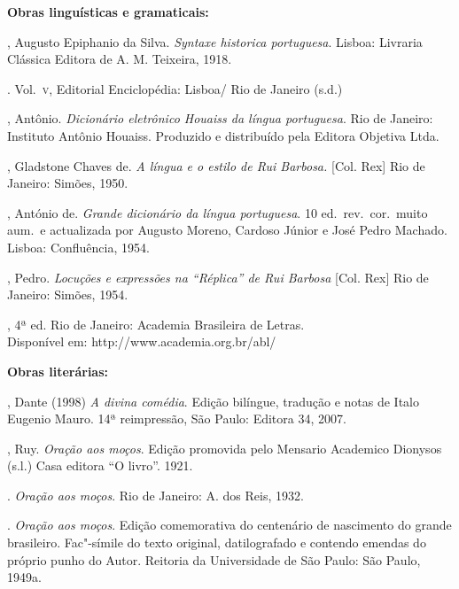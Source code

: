 \begin{bibliohedra}

\vspace*{2ex}

\item \scriptsize\textbf{Obras linguísticas e gramaticais:}

, Augusto Epiphanio da Silva. \textit{Syntaxe historica portuguesa}.
Lisboa: Livraria Clássica Editora de A. M. Teixeira, 1918.

. Vol.~\textsc{v}, Editorial
Enciclopédia: Lisboa/ Rio de Janeiro (s.d.)

, Antônio. \textit{Dicionário eletrônico Houaiss da língua
portuguesa}. Rio de Janeiro: Instituto Antônio Houaiss. Produzido e
distribuído pela Editora Objetiva Ltda.

, Gladstone Chaves de. \textit{A língua e o estilo de Rui Barbosa.}
[Col. Rex] Rio de Janeiro:  Simões,  1950.

, António de. \textit{Grande dicionário da língua
portuguesa}. 10 ed.~rev.~cor.~muito aum.~e actualizada por Augusto
Moreno, Cardoso Júnior e José Pedro Machado. Lisboa: Confluência, 1954.

, Pedro. \textit{Locuções e expressões na ``Réplica'' de Rui
Barbosa} [Col. Rex] Rio de Janeiro: Simões, 1954.

, 4ª ed. Rio de
Janeiro: Academia Brasileira de Letras.\\
Disponível em: http://www.academia.org.br/abl/

\vspace*{1ex}

\textbf{Obras literárias:}

, Dante (1998) \textit{A divina comédia}. Edição bilíngue,
tradução e notas de Italo Eugenio Mauro. 14ª reimpressão, São Paulo:
Editora 34,  2007.

, Ruy. \textit{Oração aos moços}. Edição promovida pelo Mensario
Academico Dionysos (s.l.) Casa editora ``O livro''. 1921.

\titidem. \textit{Oração aos moços}. Rio de Janeiro: A. dos Reis, 1932.

\titidem. \textit{Oração aos moços}. Edição comemorativa do
centenário de nascimento do grande brasileiro. Fac"-símile do texto
original, datilografado e contendo emendas do próprio punho do Autor.
Reitoria da Universidade de São Paulo: São Paulo, 1949a.


\end{bibliohedra}
